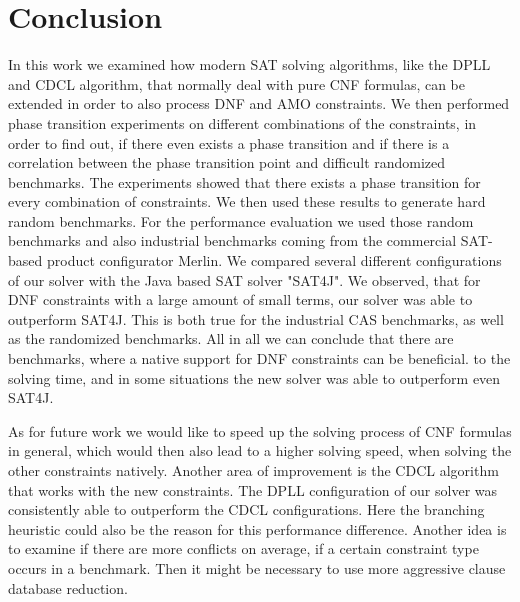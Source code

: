 \documentclass{easychair}
\begin{document}
\section{Conclusion}
In this work we examined how modern SAT solving algorithms, like the DPLL and CDCL algorithm, that normally deal with pure CNF formulas, can be extended in order to also process DNF and AMO constraints. 
We then performed phase transition experiments on different combinations of the constraints, in order to find out, if there even exists a phase transition and if there is a correlation between the phase transition point and difficult randomized benchmarks. The experiments showed that there exists a phase transition for every combination of constraints. We then used these results to generate hard random benchmarks. For the performance evaluation  we used those random benchmarks and also industrial benchmarks coming from the commercial SAT-based product configurator Merlin. We compared several different configurations of our solver with the Java based SAT solver "SAT4J".
We observed, that for DNF constraints with a large amount of small terms, our solver was able to outperform SAT4J. This is both true for the industrial CAS benchmarks, as well as the randomized benchmarks. 
All in all we can conclude that there are benchmarks, where a native support for DNF constraints can be beneficial. to the solving time, and in some situations the new solver was able to outperform even SAT4J.

As for future work we would like to speed up the solving process of CNF formulas in general, which would then also lead to a higher solving speed, when solving the other constraints natively.
Another area of improvement is the CDCL algorithm that works with the new constraints. The DPLL configuration of our solver was consistently able to outperform the CDCL configurations. Here the branching heuristic could also be the reason for this performance difference. Another idea is to examine if there are more conflicts on average, if a certain constraint type occurs in a benchmark. Then it might be necessary to use more aggressive clause database reduction.

\label{sect:bib}

%
%
%

\end{document}
